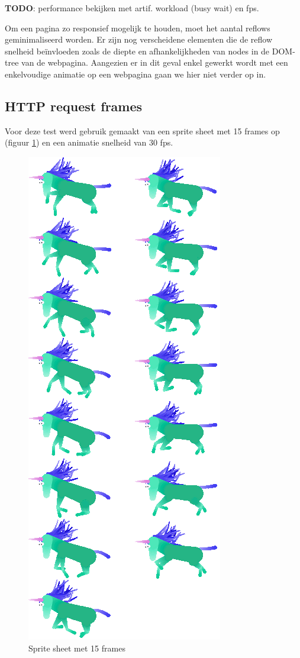 \textbf{TODO}: performance bekijken met artif. workload (busy wait) en fps.

Om een pagina zo responsief mogelijk te houden, moet het aantal reflows geminimaliseerd worden. Er zijn nog verscheidene elementen die de reflow snelheid beïnvloeden zoals de diepte en afhankelijkheden van nodes in de DOM-tree van de webpagina. Aangezien er in dit geval enkel gewerkt wordt met een enkelvoudige animatie op een webpagina gaan we hier niet verder op in.
\cite{improvePerformance}

\subsection{HTTP request frames}

Voor deze test werd gebruik gemaakt van een sprite sheet met 15 frames op (figuur \ref{sheet}) en een animatie snelheid van 30 fps.

\begin{figure} [H]
	\centering
	\includegraphics [scale=0.7] {img/charging.png}
	\caption{Sprite sheet met 15 frames} \label{sheet}
\end{figure}

